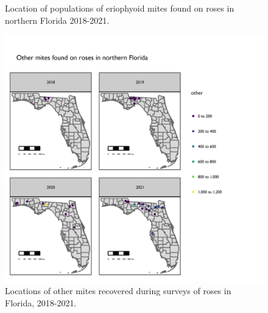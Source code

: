 \documentclass[12pt,final,CPage]{ufthesis}
\begin{document}
{\begin{figure}[p]
{  }

  \caption[Location of populations of eriophyoid mites found on roses in northern Florida]{Location of populations of eriophyoid mites found on roses in northern Florida 2018-2021.}\label{fig:survey-map-3}
  \end{figure}
  \begin{figure}[p]

  {\centering \includegraphics[width=1\linewidth]{figure/rrv_survey_map_years_others} 

  }

  \caption[Locations of other mites recovered during surveys of roses in Florida]{Locations of other mites recovered during surveys of roses in Florida, 2018-2021.}\label{fig:survey-map-4}
  \end{figure}
  \begin{table}[!h]


\end{table}}
\end{document}
